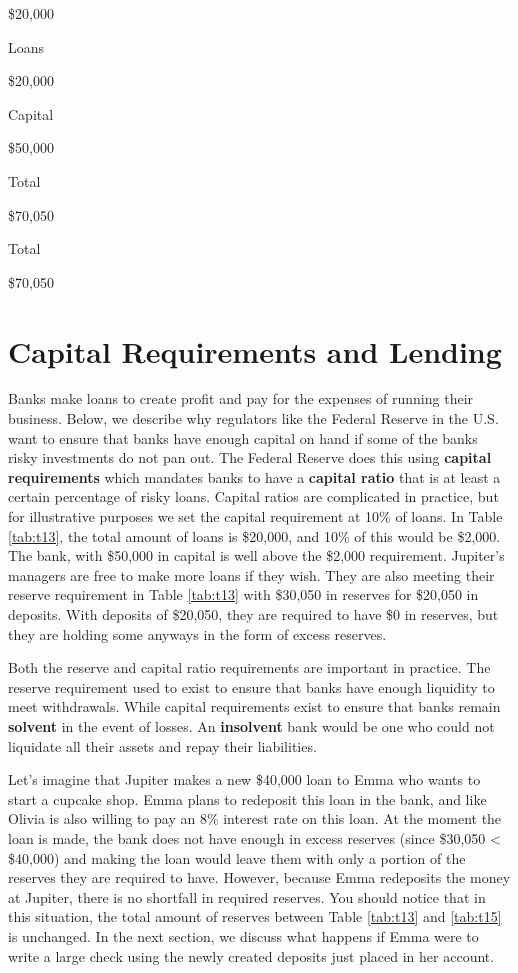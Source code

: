 \documentclass[
]{book}
\begin{document}
\$20,000

Loans

\$20,000

Capital

\$50,000

Total

\$70,050

Total

\$70,050

\hypertarget{capital-requirements-and-lending}{%
\section{Capital Requirements and Lending}\label{capital-requirements-and-lending}}

Banks make loans to create profit and pay for the expenses of running their business. Below, we describe why regulators like the Federal Reserve in the U.S. want to ensure that banks have enough capital on hand if some of the banks risky investments do not pan out. The Federal Reserve does this using \textbf{capital requirements} which mandates banks to have a \textbf{capital ratio} that is at least a certain percentage of risky loans. Capital ratios are complicated in practice, but for illustrative purposes we set the capital requirement at 10\% of loans. In Table \ref{tab:t13}, the total amount of loans is \$20,000, and 10\% of this would be \$2,000. The bank, with \$50,000 in capital is well above the \$2,000 requirement. Jupiter's managers are free to make more loans if they wish. They are also meeting their reserve requirement in Table \ref{tab:t13} with \$30,050 in reserves for \$20,050 in deposits. With deposits of \$20,050, they are required to have \$0 in reserves, but they are holding some anyways in the form of excess reserves.

Both the reserve and capital ratio requirements are important in practice. The reserve requirement used to exist to ensure that banks have enough liquidity to meet withdrawals. While capital requirements exist to ensure that banks remain \textbf{solvent} in the event of losses. An \textbf{insolvent} bank would be one who could not liquidate all their assets and repay their liabilities.

Let's imagine that Jupiter makes a new \$40,000 loan to Emma who wants to start a cupcake shop. Emma plans to redeposit this loan in the bank, and like Olivia is also willing to pay an 8\% interest rate on this loan. At the moment the loan is made, the bank does not have enough in excess reserves (since \$30,050 \textless{} \$40,000) and making the loan would leave them with only a portion of the reserves they are required to have. However, because Emma redeposits the money at Jupiter, there is no shortfall in required reserves. You should notice that in this situation, the total amount of reserves between Table \ref{tab:t13} and \ref{tab:t15} is unchanged. In the next section, we discuss what happens if Emma were to write a large check using the newly created deposits just placed in her account.
\end{document}
